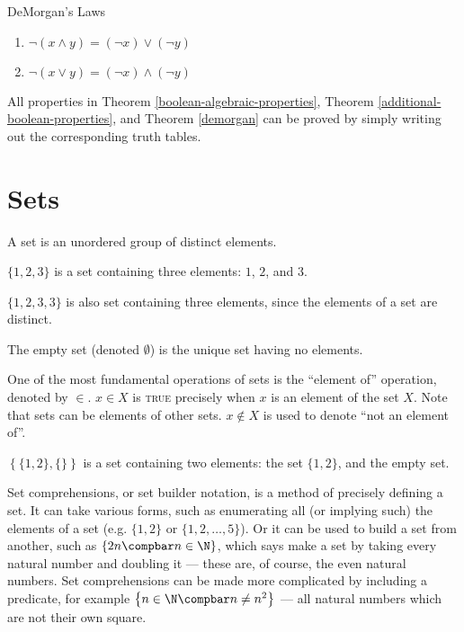 \documentclass[12pt]{article}
\begin{document}
\begin{thm}{DeMorgan's Laws}\label{demorgan}\proofbreak
    \begin{enumerate}
        \item $\neg(x \land y) = (\neg x) \lor (\neg y)$
        \item $\neg(x \lor y) = (\neg x) \land (\neg y)$
    \end{enumerate}
\end{thm}

\begin{rmk}
    All properties in Theorem \ref{boolean-algebraic-properties}, Theorem \ref{additional-boolean-properties}, and Theorem \ref{demorgan} can be proved by simply writing out the corresponding truth tables.
\end{rmk}

\section{Sets}

\begin{defn}\label{set}
    A set is an unordered group of distinct elements.
\end{defn}

\begin{exmp}
    $\{1, 2, 3\}$ is a set containing three elements: $1$, $2$, and $3$.
\end{exmp}

\begin{rmk}
    $\{1, 2, 3, 3\}$ is also set containing three elements, since the elements of a set are distinct.
\end{rmk}

\begin{defn}\label{empty-set}
    The empty set (denoted $\emptyset$) is the unique set having no elements.
\end{defn}

One of the most fundamental operations of sets is the ``element of'' operation, denoted by $\in$. $x \in X$ is \textsc{true} precisely when $x$ is an element of the set $X$. Note that sets can be elements of other sets. $x \notin X$ is used to denote ``not an element of''.

\begin{exmp}
    $\left\{\{1, 2\}, \{\}\right\}$ is a set containing two elements: the set $\{1, 2\}$, and the empty set.
\end{exmp}

Set comprehensions, or set builder notation, is a method of precisely defining a set. It can take various forms, such as enumerating all (or implying such) the elements of a set (e.g. $\{1, 2\}$ or $\{1, 2, \ldots, 5\}$). Or it can be used to build a set from another, such as $\left\{2n \compbar n \in \N\right\}$, which says make a set by taking every natural number and doubling it --- these are, of course, the even natural numbers. Set comprehensions can be made more complicated by including a predicate, for example $\left\{n \in \N \compbar n \neq n^2 \right\}$ --- all natural numbers which are not their own square.
\end{document}
